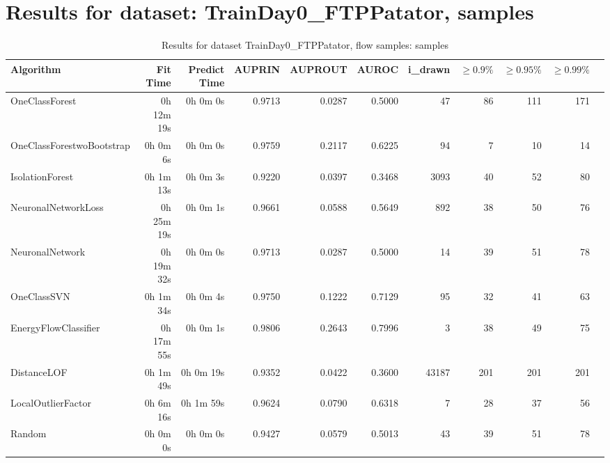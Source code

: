 \documentclass{article}
\begin{document}
\section*{Results for dataset: TrainDay0_FTPPatator, samples}
\begin{table}[h!]
\centering
\caption{Results for dataset TrainDay0_FTPPatator, flow samples: samples}
\begin{tabular}{lrrrrrrrrrr}
\toprule
Algorithm & Fit Time & Predict Time & AUPRIN & AUPROUT & AUROC & i\_drawn & $\geq 0.9\%$ & $\geq 0.95\%$ & $\geq 0.99\%$ \\
\midrule
OneClassForest & 0h 12m 19s & 0h 0m 0s & 0.9713 & 0.0287 & 0.5000 & 47 & 86 & 111 & 171 \\
OneClassForestwoBootstrap & 0h 0m 6s & 0h 0m 0s & 0.9759 & 0.2117 & 0.6225 & 94 & 7 & 10 & 14 \\
IsolationForest & 0h 1m 13s & 0h 0m 3s & 0.9220 & 0.0397 & 0.3468 & 3093 & 40 & 52 & 80 \\
NeuronalNetworkLoss & 0h 25m 19s & 0h 0m 1s & 0.9661 & 0.0588 & 0.5649 & 892 & 38 & 50 & 76 \\
NeuronalNetwork & 0h 19m 32s & 0h 0m 0s & 0.9713 & 0.0287 & 0.5000 & 14 & 39 & 51 & 78 \\
OneClassSVN & 0h 1m 34s & 0h 0m 4s & 0.9750 & 0.1222 & 0.7129 & 95 & 32 & 41 & 63 \\
EnergyFlowClassifier & 0h 17m 55s & 0h 0m 1s & 0.9806 & 0.2643 & 0.7996 & 3 & 38 & 49 & 75 \\
DistanceLOF & 0h 1m 49s & 0h 0m 19s & 0.9352 & 0.0422 & 0.3600 & 43187 & 201 & 201 & 201 \\
LocalOutlierFactor & 0h 6m 16s & 0h 1m 59s & 0.9624 & 0.0790 & 0.6318 & 7 & 28 & 37 & 56 \\
Random & 0h 0m 0s & 0h 0m 0s & 0.9427 & 0.0579 & 0.5013 & 43 & 39 & 51 & 78 \\
\bottomrule
\end{tabular}
\end{table}
\end{document}
